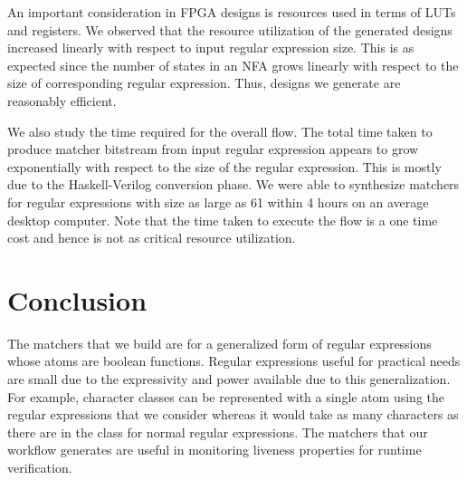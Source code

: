 \documentclass{article}
\begin{document}
An important consideration in FPGA designs is resources used in terms
of LUTs and registers.
We observed that the resource utilization of the generated designs
increased linearly with respect to input regular expression size.
This is as expected since the number of states in an NFA grows
linearly with respect to the size of corresponding regular expression.
Thus, designs we generate are reasonably efficient.

We also study the time required for the overall flow.
The total time taken to produce matcher bitstream from input regular
expression appears to grow exponentially with respect to the size of
the regular expression.
This is mostly due to the Haskell-Verilog conversion phase.
%
We were able to synthesize matchers for regular expressions with size
as large as 61 within 4 hours on an average desktop computer.
%
Note that the time taken to execute the flow is a one time cost and
hence is not as critical resource utilization.

\section{Conclusion}
The matchers that we build are for a generalized form of regular
expressions whose atoms are boolean functions.
Regular expressions useful for practical needs are small due to the
expressivity and power available due to this generalization.
%
For example, character classes can be represented with a single atom
using the regular expressions that we consider whereas it would take
as many characters as there are in the class for normal regular
expressions.
The matchers that our workflow generates are useful in monitoring
liveness properties for runtime verification.
%
%
\end{document}
